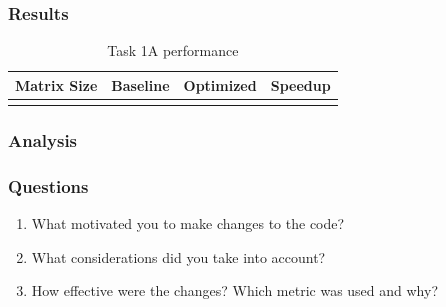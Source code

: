 \subsubsection{Results}

\begin{table}[H]
\centering
\caption{Task 1A performance}
\begin{tabular}{lccc}
\toprule
Matrix Size & Baseline & Optimized & Speedup \\
\midrule
\TODO{...} & \TODO{...} & \TODO{...} & \TODO{...} \\
\bottomrule
\end{tabular}
\end{table}

\subsubsection{Analysis}


\subsubsection{Questions}

\begin{enumerate}
    \item What motivated you to make changes to the code?
    \item What considerations did you take into account?
    \item How effective were the changes? Which metric was used and why?
\end{enumerate}

